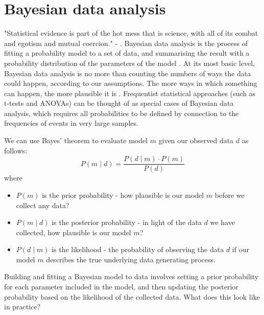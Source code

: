 \section{Bayesian data analysis}
"Statistical evidence is part of the hot mess that is science, with all of its combat and egotism and mutual coercion." - \textcite{mcelreath_statistical_2020}.
Bayesian data analysis is the process of fitting a probability model to a set of data, and summarising the result with a probability distribution of the parameters of the model \cite{gelman_bayesian_2014}.
At its most basic level, Bayesian data analysis is no more than counting the numbers of ways the data could happen, according to our assumptions.
The more ways in which something can happen, the more plausible it is \cite{mcelreath_statistical_2020}.
Frequentist statistical approaches (such as t-tests and ANOVAs) can be thought of as special cases of Bayesian data analysis, which requires all probabilities to be defined by connection to the frequencies of events in very large samples.

We can use Bayes' theorem to evaluate model $m$ given our observed data $d$ as follows:
\begin{equation}
P(m \mid d) = \frac{P(d \mid m) \cdot P(m)}{P(d)}
\end{equation}
where
\begin{itemize}
\item $P(m)$ is the prior probability - how plausible is our model $m$ before we collect any data?
\item $P(m \mid d)$ is the posterior probability - in light of the data $d$ we have collected, how plausible is our model $m$?
\item $P(d \mid m)$ is the likelihood - the probability of observing the data $d$ if our model $m$ describes the true underlying data generating process.
\end{itemize}

Building and fitting a Bayesian model to data involves setting a prior probability for each parameter included in the model, and then updating the posterior probability based on the likelihood of the collected data.
What does this look like in practice?

